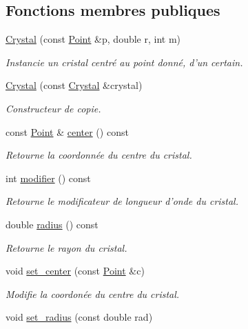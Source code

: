 \subsection*{Fonctions membres publiques}
\begin{DoxyCompactItemize}
\item 
\hyperlink{classCrystal_a21597991198db73fdfe051ae1a4fec68}{Crystal} (const \hyperlink{classPoint}{Point} \&p, double r, int m)
\begin{DoxyCompactList}\small\item\em Instancie un cristal centré au point donné, d'un certain. \end{DoxyCompactList}\item 
\hyperlink{classCrystal_abcff7d0100d1f2baa0b6d993618f6a3d}{Crystal} (const \hyperlink{classCrystal}{Crystal} \&crystal)
\begin{DoxyCompactList}\small\item\em Constructeur de copie. \end{DoxyCompactList}\item 
const \hyperlink{classPoint}{Point} \& \hyperlink{classCrystal_a6c817c9e47ec46b632a02c8098373562}{center} () const 
\begin{DoxyCompactList}\small\item\em Retourne la coordonnée du centre du cristal. \end{DoxyCompactList}\item 
int \hyperlink{classCrystal_a227a44060d81139b167f1f8ed2b2e2a9}{modifier} () const 
\begin{DoxyCompactList}\small\item\em Retourne le modificateur de longueur d'onde du cristal. \end{DoxyCompactList}\item 
double \hyperlink{classCrystal_abad9d6b77ef64effbd692a445fb0fead}{radius} () const 
\begin{DoxyCompactList}\small\item\em Retourne le rayon du cristal. \end{DoxyCompactList}\item 
void \hyperlink{classCrystal_a3639d10c52b98d93bc81f21fb6e2e929}{set\+\_\+center} (const \hyperlink{classPoint}{Point} \&c)
\begin{DoxyCompactList}\small\item\em Modifie la coordonée du centre du cristal. \end{DoxyCompactList}\item 
void \hyperlink{classCrystal_a05a53bb4f4d519248d62990f8a62b786}{set\+\_\+radius} (const double rad)

\end{DoxyCompactItemize}
